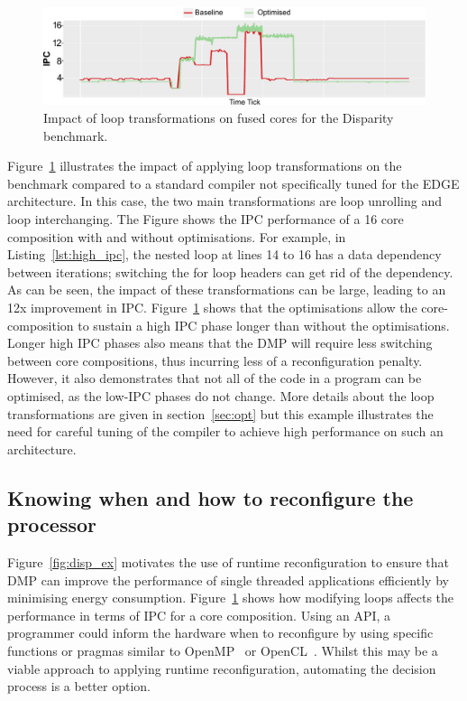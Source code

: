 \begin{figure}[t]
    \includegraphics[width=\textwidth]{cases-paper/graphics/motivation/code_opt_3.pdf}
    \caption{Impact of loop transformations on fused cores for the Disparity benchmark.} 
    \label{fig:compmotiv}
\vspace{1em}
\end{figure}

Figure~\ref{fig:compmotiv} illustrates the impact of applying loop transformations on the  benchmark compared to a standard compiler not specifically tuned for the EDGE architecture.
In this case, the two main transformations are loop unrolling and loop interchanging.
The Figure shows the IPC performance of a 16 core composition with and without optimisations.
For example, in Listing~\ref{lst:high_ipc}, the nested loop at lines 14 to 16 has a data dependency between iterations; switching the for loop headers can get rid of the dependency.
As can be seen, the impact of these transformations can be large, leading to an 12x improvement in IPC.
Figure~\ref{fig:compmotiv} shows that the optimisations allow the core-composition to sustain a high IPC phase longer than without the optimisations.
Longer high IPC phases also means that the DMP will require less switching between core compositions, thus incurring less of a reconfiguration penalty.
However, it also demonstrates that not all of the code in a program can be optimised, as the low-IPC phases do not change.
More details about the loop transformations are given in section~\ref{sec:opt} but this example illustrates the need for careful tuning of the compiler to achieve high performance on such an architecture.

\subsection{Knowing when and how to reconfigure the processor}

Figure~\ref{fig:disp_ex} motivates the use of runtime reconfiguration to ensure that DMP can improve the performance of single threaded applications efficiently by minimising energy consumption.
Figure~\ref{fig:compmotiv} shows how modifying loops affects the performance in terms of IPC for a core composition.
Using an API, a programmer could inform the hardware when to reconfigure by using specific functions or pragmas similar to OpenMP~\cite{openmp} or OpenCL~\cite{opencl}.
Whilst this may be a viable approach to applying runtime reconfiguration, automating the decision process is a better option.


